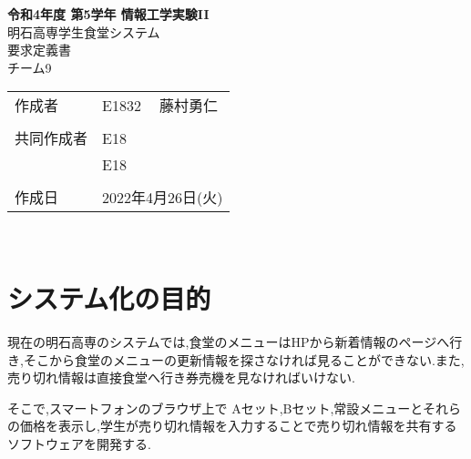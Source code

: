 \documentclass[dvipdfmx, 11pt]{jsarticle}
\begin{document}
\begin{titlepage}
    \centering
    \textbf{令和4年度 第5学年 情報工学実験II}
    \vspace{40pt} \\
    {\LARGE 明石高専学生食堂システム}
    \vspace{10pt} \\
    {\LARGE 要求定義書}
    \vspace{80pt} \\
    チーム9
    \vspace{10pt} \\
    \begin{tabular}{lll}
        作成者      & E1832 & 藤村勇仁 \\
                    &       & \\
        共同作成者  & E18 &  \\
                    & E18 &  \\
                    &       & \\
        作成日      & \multicolumn{2}{l}{2022年4月26日(火)}
    \end{tabular}
    \vspace{\baselineskip} \\
\end{titlepage}

\section{システム化の目的}
    現在の明石高専のシステムでは,食堂のメニューはHPから新着情報のページへ行き,そこから食堂のメニューの更新情報を探さなければ見ることができない.また,売り切れ情報は直接食堂へ行き券売機を見なければいけない. \par
    そこで,スマートフォンのブラウザ上で Aセット,Bセット,常設メニューとそれらの価格を表示し,学生が売り切れ情報を入力することで売り切れ情報を共有するソフトウェアを開発する.
\end{document}
